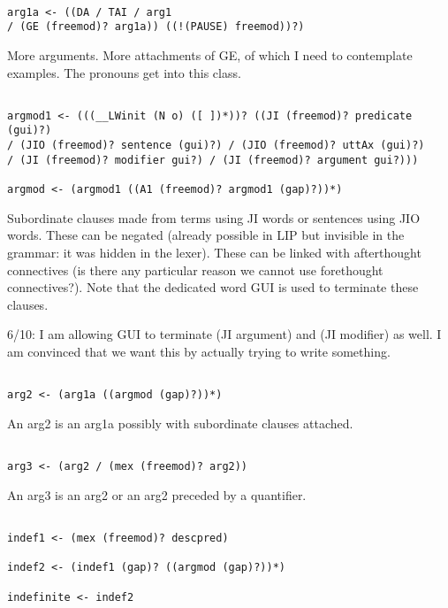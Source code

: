 \documentclass[12pt]{article}
\begin{document}
\begin{verbatim}

arg1a <- ((DA / TAI / arg1 
/ (GE (freemod)? arg1a)) ((!(PAUSE) freemod))?)

\end{verbatim}

More arguments.  More attachments of GE, of which I need to contemplate examples.  The pronouns get into this class.

\begin{verbatim}

argmod1 <- (((__LWinit (N o) ([ ])*))? ((JI (freemod)? predicate (gui)?) 
/ (JIO (freemod)? sentence (gui)?) / (JIO (freemod)? uttAx (gui)?) 
/ (JI (freemod)? modifier gui?) / (JI (freemod)? argument gui?)))

argmod <- (argmod1 ((A1 (freemod)? argmod1 (gap)?))*)

\end{verbatim}

Subordinate clauses made from terms using JI words or sentences using JIO words.  These can be negated (already possible in
LIP but invisible in the grammar:  it was hidden in the lexer).  These can be linked with afterthought connectives (is there any particular reason we cannot use forethought connectives?).  Note that the dedicated word GUI is used to terminate these clauses.

6/10:  I am allowing GUI to terminate (JI argument) and (JI modifier) as well.  I am convinced that we want this by actually trying to write something.

\begin{verbatim}

arg2 <- (arg1a ((argmod (gap)?))*)

\end{verbatim}

An arg2 is an arg1a possibly with subordinate clauses attached.

\begin{verbatim}

arg3 <- (arg2 / (mex (freemod)? arg2))

\end{verbatim}

An arg3 is an arg2 or an arg2 preceded by a quantifier.

\begin{verbatim}

indef1 <- (mex (freemod)? descpred)

indef2 <- (indef1 (gap)? ((argmod (gap)?))*)

indefinite <- indef2

\end{verbatim}
\end{document}
